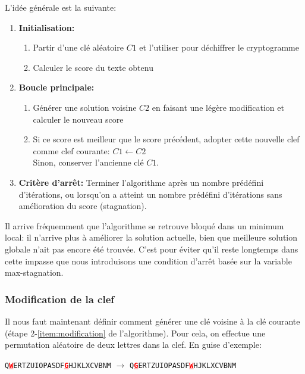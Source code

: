 \documentclass[a4paper]{article}
\newcommand{\highlight}[1]{\textbf{\textcolor{red}{\underline{#1}}}}
\begin{document}
L’idée générale est la suivante:
\begin{enumerate}
    \item \textbf{Initialisation:}
    \begin{enumerate}
        \item Partir d'une clé aléatoire $C1$ et l'utiliser pour déchiffrer le cryptogramme
        \item Calculer le score du texte obtenu
    \end{enumerate}
    \item \textbf{Boucle principale:}
    \begin{enumerate}[label= (\alph*)]
        \item\label{item:modification} Générer une solution voisine $C2$ en faisant une légère modification et calculer le nouveau score
        \item Si ce score est meilleur que le score précédent, adopter cette nouvelle clef comme clef courante: $C1 \leftarrow C2$\\
              Sinon, conserver l’ancienne clé $C1$.
    \end{enumerate}
    \item \textbf{Critère d'arrêt:} Terminer l'algorithme après un nombre prédéfini d'itérations, ou lorsqu'on a atteint un nombre prédéfini d'itérations sans amélioration du score (stagnation).
\end{enumerate}

Il arrive fréquemment que l’algorithme se retrouve bloqué dans un minimum local: il n’arrive plus à améliorer la solution actuelle, bien que meilleure solution globale n’ait pas encore été trouvée.  
C'est pour éviter qu'il reste longtemps dans cette impasse que nous introduisons une condition d'arrêt basée sur la variable max-stagnation.

\subsubsection*{Modification de la clef}\label{modification}

Il nous faut maintenant définir comment générer une clé voisine à la clé courante (étape 2-\ref{item:modification} de l’algorithme).  
Pour cela, on effectue une permutation aléatoire de deux lettres dans la clef. En guise d'exemple:
\begin{center}
\texttt{Q\highlight{W}ERTZUIOPASDF\highlight{G}HJKLXCVBNM} $\rightarrow$ \texttt{Q\highlight{G}ERTZUIOPASDF\highlight{W}HJKLXCVBNM}
\end{center}
\end{document}
